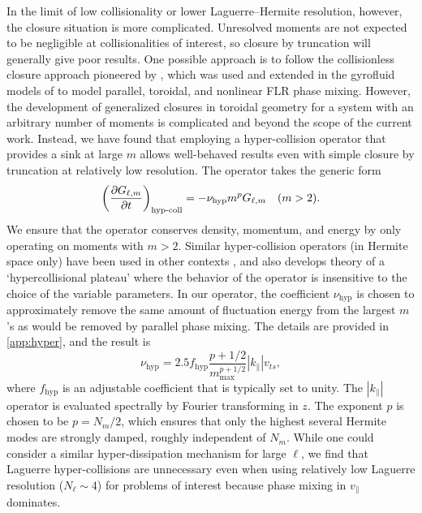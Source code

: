 \documentclass{jpp}
\begin{document}
In the limit of low collisionality or lower Laguerre–Hermite resolution, however, the closure situation is more
complicated. Unresolved moments are not expected to be negligible at collisionalities
of interest, so closure by truncation will generally give poor results.
One possible approach is to follow the collisionless closure approach pioneered by \citet{Hammett1990}, which was used and extended in the gyrofluid models
of \citet{Dorland1993, Beer1996, Snyder2001, Smith1997} to model parallel, toroidal, and nonlinear FLR phase mixing. 
However, the development of generalized closures in toroidal geometry for a system with an arbitrary number of moments is complicated and beyond the scope of the current work. 
{\color{black}Instead, we have found that employing a hyper-collision operator that provides a sink at large $m$ allows well-behaved results even with simple closure by truncation at relatively low resolution. The operator takes the generic form
\begin{equation}
\left(\frac{\partial G_{\ell,m}}{\partial t}\right)_\textrm{hyp-coll}  =
-\nu_\mathrm{hyp} m^{p} G_{\ell, m} \quad (m>2).
\end{equation}
We ensure that the operator conserves density, momentum, and energy by only operating on moments with $m>2$. Similar hyper-collision operators (in Hermite space only) have been used in other contexts \citep{Parker2015, Parker2015a, Loureiro2016}, and \citet{Parker2015a} also develops theory of a `hypercollisional plateau' where the behavior of the operator is insensitive to the choice of the variable parameters.
In our operator, the coefficient $\nu_\mathrm{hyp}$ is chosen to approximately remove the same amount of fluctuation energy from the largest $m$'s as would be removed by parallel phase mixing. The details are provided in \cref{app:hyper}, and the result is
\begin{equation}
     \nu_\mathrm{hyp} = 2.5 f_\mathrm{hyp} \frac{p+1/2}{m_\mathrm{max}^{p+1/2}}|k_\parallel|v_{ts},
\end{equation}
where $f_\mathrm{hyp}$ is an adjustable coefficient that is typically set to unity.
The $|k_\parallel|$ operator is evaluated spectrally by Fourier transforming in $z$.
The exponent $p$ is chosen to be $p=N_m/2$, which ensures that only the highest several Hermite modes are strongly damped, roughly independent of $N_m$. While one could consider a similar hyper-dissipation mechanism for large $\ell$, we find that Laguerre hyper-collisions are unnecessary even when using relatively low Laguerre resolution ($N_\ell\sim 4$) for problems of interest because  phase mixing in $v_\parallel$ dominates. 
}
\end{document}
